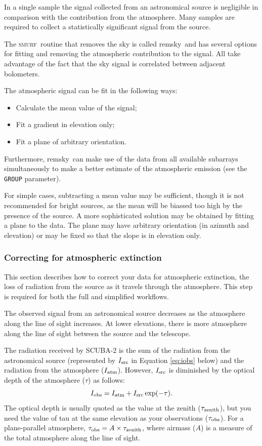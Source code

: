 \documentclass[twoside,11pt]{article}
\newcommand{\xref}[3]{#1}
\newcommand{\xlabel}[1]{}
\renewcommand{\_}{\texttt{\symbol{95}}}
\newcommand{\SMURF}{\textsc{smurf}}
\newcommand{\task}[1]{\textsf{#1}}
\newcommand{\remsky}{\xref{\task{remsky}}{sun258}{REMSKY}}
\newcommand{\aparam}[1]{\texttt{#1}}     %
\begin{document}
In a single sample the signal collected from an astronomical source is
negligible in comparison with the contribution from the
atmosphere. Many samples are required to collect a statistically
significant signal from the source.

The \SMURF\ routine that removes the sky is called \remsky\ and has
several options for fitting and removing the atmospheric contribution
to the signal. All take advantage of the fact that the sky signal is
correlated between adjacent bolometers.

The atmospheric signal can be fit in the following ways:
\begin{itemize}
\item Calculate the mean value of the signal;
\item Fit a gradient in elevation only;
\item Fit a plane of arbitrary orientation.
\end{itemize}
Furthermore, \remsky\ can make use of the data from all available
subarrays simultaneously to make a better estimate of the atmospheric
emission (see the \aparam{GROUP} parameter).

For simple cases, subtracting a mean value may be sufficient, though
it is not recommended for bright sources, as the mean will be biassed
too high by the presence of the source. A more sophisticated solution
may be obtained by fitting a plane to the data. The plane may have
arbitrary orientation (in azimuth and elevation) or may be fixed so
that the slope is in elevation only.

\subsubsection{\xlabel{extinction}Correcting for atmospheric extinction\label{se:extinction}}

This section describes how to correct your data for atmospheric
extinction, the loss of radiation from the source as it travels
through the atmosphere. This step is required for both the full and
simplified workflows.

The observed signal from an astronomical source decreases as the
atmosphere along the line of sight increases. At lower elevations,
there is more atmosphere along the line of sight between the source
and the telescope.

The radiation received by SCUBA-2 is the sum of the radiation from the
astronomical source (represented by $I_{\rm src}$ in Equation
\ref{eq:iobs} below) and the radiation from the atmosphere ($I_{\rm
  atm}$). However, $I_{\rm src}$ is diminished by the optical depth
of the atmosphere ($\tau$) as follows:
\begin{equation}
I_{\rm obs} = I_{\rm atm} + I_{\rm src} \exp(-\tau).
\label{eq:iobs}
\end{equation}
The optical depth is usually quoted as the value at the zenith
($\tau_{\rm zenith}$), but you need the value of tau at the same
elevation as your observations ($\tau_{\rm obs}$). For a
plane-parallel atmosphere, $\tau_{\rm obs} = A \times \tau_{\rm
  zenith}$, where airmass ($A$) is a measure of the total atmosphere
along the line of sight.
\end{document}
